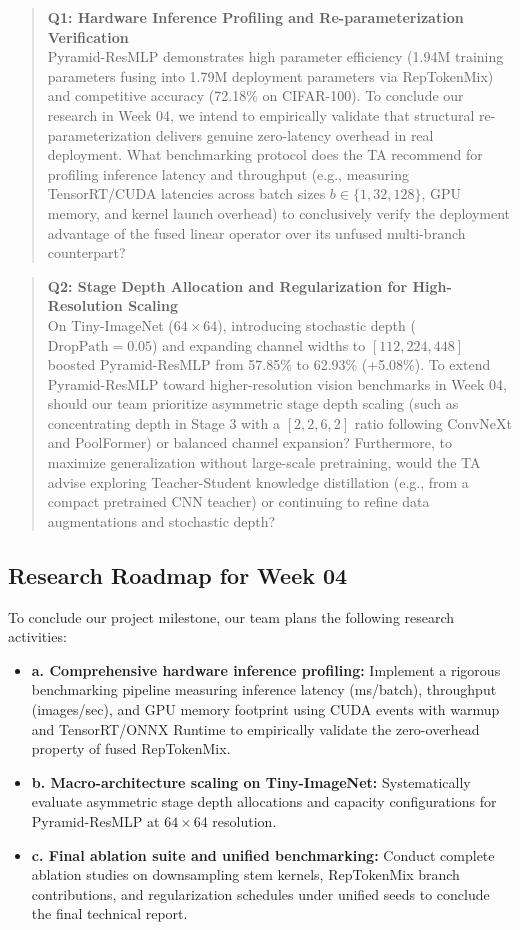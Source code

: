 \begin{quote}
\textbf{Q1: Hardware Inference Profiling and Re-parameterization Verification} \\
Pyramid-ResMLP demonstrates high parameter efficiency (1.94M training parameters fusing into 1.79M deployment parameters via RepTokenMix) and competitive accuracy (72.18\% on CIFAR-100). To conclude our research in Week 04, we intend to empirically validate that structural re-parameterization delivers genuine zero-latency overhead in real deployment. What benchmarking protocol does the TA recommend for profiling inference latency and throughput (e.g., measuring TensorRT/CUDA latencies across batch sizes $b \in \{1, 32, 128\}$, GPU memory, and kernel launch overhead) to conclusively verify the deployment advantage of the fused linear operator over its unfused multi-branch counterpart?
\end{quote}

\begin{quote}
\textbf{Q2: Stage Depth Allocation and Regularization for High-Resolution Scaling} \\
On Tiny-ImageNet ($64 \times 64$), introducing stochastic depth ($\text{DropPath} = 0.05$) and expanding channel widths to $[112, 224, 448]$ boosted Pyramid-ResMLP from 57.85\% to 62.93\% (+5.08\%). To extend Pyramid-ResMLP toward higher-resolution vision benchmarks in Week 04, should our team prioritize asymmetric stage depth scaling (such as concentrating depth in Stage 3 with a $[2, 2, 6, 2]$ ratio following ConvNeXt and PoolFormer) or balanced channel expansion? Furthermore, to maximize generalization without large-scale pretraining, would the TA advise exploring Teacher-Student knowledge distillation (e.g., from a compact pretrained CNN teacher) or continuing to refine data augmentations and stochastic depth?
\end{quote}

\subsection{Research Roadmap for Week 04}
To conclude our project milestone, our team plans the following research activities:
\begin{itemize}
    \item \textbf{a. Comprehensive hardware inference profiling:} Implement a rigorous benchmarking pipeline measuring inference latency (ms/batch), throughput (images/sec), and GPU memory footprint using CUDA events with warmup and TensorRT/ONNX Runtime to empirically validate the zero-overhead property of fused RepTokenMix.
    \item \textbf{b. Macro-architecture scaling on Tiny-ImageNet:} Systematically evaluate asymmetric stage depth allocations and capacity configurations for Pyramid-ResMLP at $64 \times 64$ resolution.
    \item \textbf{c. Final ablation suite and unified benchmarking:} Conduct complete ablation studies on downsampling stem kernels, RepTokenMix branch contributions, and regularization schedules under unified seeds to conclude the final technical report.
\end{itemize}
